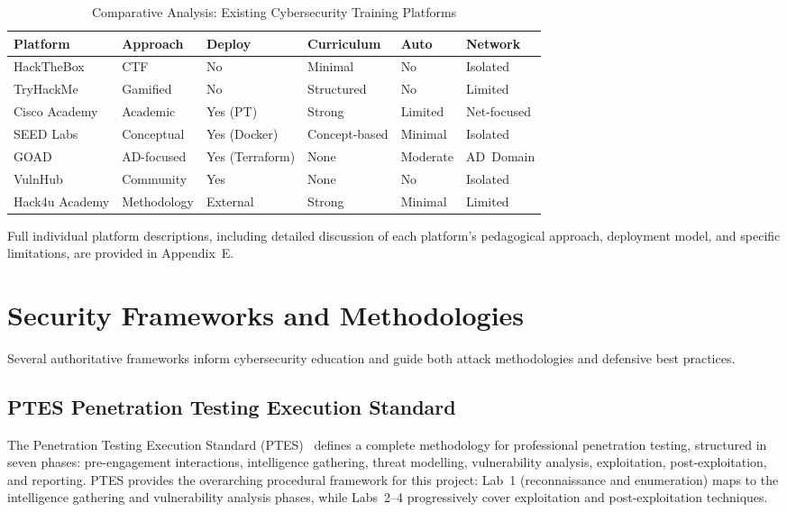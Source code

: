 \begin{table}[H]
\centering
\scriptsize
\setlength{\tabcolsep}{4pt}
\begin{tabularx}{\textwidth}{lXXXXX}
\toprule
\textbf{Platform} & \textbf{Approach} & \textbf{Deploy} & \textbf{Curriculum} & \textbf{Auto} & \textbf{Network} \\
\midrule
HackTheBox & CTF & No & Minimal & No & Isolated \\
TryHackMe & Gamified & No & Structured & No & Limited \\
Cisco Academy & Academic & Yes (PT) & Strong & Limited & Net-focused \\
SEED Labs & Conceptual & Yes (Docker) & Concept-based & Minimal & Isolated \\
GOAD & AD-focused & Yes (\mbox{Terraform}) & None & Moderate & \mbox{AD Domain} \\
VulnHub & Community & Yes & None & No & Isolated \\
Hack4u Academy & Methodology & External & Strong & Minimal & Limited \\
\bottomrule
\end{tabularx}
\caption{Comparative Analysis: Existing Cybersecurity Training Platforms}
\label{tab:platform_comparison}
\end{table}

Full individual platform descriptions, including detailed discussion of each platform's
pedagogical approach, deployment model, and specific limitations, are provided in Appendix~E.

\section{Security Frameworks and Methodologies}

Several authoritative frameworks inform cybersecurity education and guide both attack
methodologies and defensive best practices.

\subsection{PTES \textendash{} Penetration Testing Execution Standard}

The Penetration Testing Execution Standard (PTES)~\cite{ptes} defines a complete methodology
for professional penetration testing, structured in seven phases: pre-engagement interactions,
intelligence gathering, threat modelling, vulnerability analysis, exploitation, post-exploitation,
and reporting. PTES provides the overarching procedural framework for this project: Lab~1
(reconnaissance and enumeration) maps to the intelligence gathering and vulnerability analysis
phases, while Labs~2--4 progressively cover exploitation and post-exploitation techniques.


